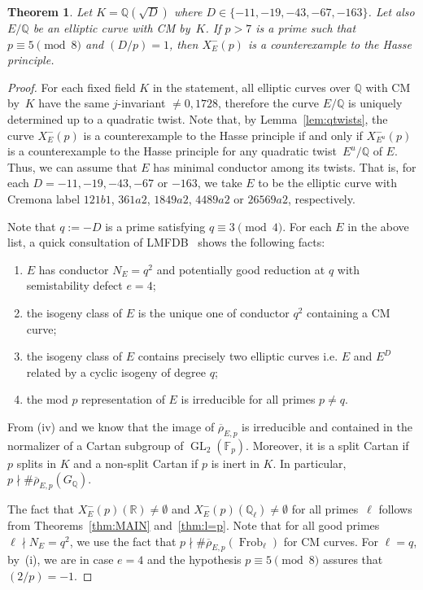 \documentclass[12pt]{amsart}
\numberwithin{equation}{section}
\newtheorem{theorem}[equation]{Theorem}
\theoremstyle{definition}
\newcommand{\F}{\mathbb{F}}
\newcommand{\Q}{\mathbb{Q}}
\newcommand{\R}{\mathbb{R}}
\newcommand{\rhobar}{{\overline{\rho}}}
\newcommand{\Xp}{X_E^{-}(p)}
\DeclareMathOperator{\GL}{GL}
\DeclareMathOperator{\Frob}{Frob}
\begin{document}
\begin{theorem} \label{thm:HasseSplit}
Let $K=\Q(\sqrt{D})$ where $D \in \{-11,-19,-43,-67,-163 \}$. Let also $E/\Q$ be an elliptic curve with CM by~$K$. If $p > 7$ is a prime such that $p \equiv 5 \pmod{8}$ and $(D / p) = 1$, then $\Xp$ is a counterexample to the Hasse principle.
\end{theorem}
\begin{proof}
For each fixed field $K$ in the statement, all elliptic curves over $\Q$ with CM by~$K$ have the same
$j$-invariant $\neq 0, 1728$, therefore the curve $E/\Q$ is uniquely determined up to a quadratic twist. Note that, by Lemma~\ref{lem:qtwists}, the curve $\Xp$ is a counterexample to the Hasse principle if and only if $X_{E^u}^-(p)$ is a counterexample to the Hasse principle for any quadratic twist~$E^u /\Q$ of $E$. Thus,
we can assume that $E$ has minimal conductor among its twists. That is, for each $D = -11,-19,-43,-67$ or $-163$, we take $E$ to be the elliptic curve with Cremona label
$121b1$, $361a2$, $1849a2$, $4489a2$ or $26569a2$, respectively.

Note that $q := -D$ is a prime satisfying $q \equiv 3 \pmod{4}$.
For each $E$ in the above list, a quick consultation of LMFDB~\cite{LMFDB} shows the following facts: 
\begin{enumerate}
    \item[(i)] $E$ has conductor $N_E=q^2$ and potentially good reduction at $q$ with semistability defect $e = 4$;\label{CM1}
        \item[(ii)] the isogeny class of $E$ is the unique one of conductor $q^2$ containing a CM curve; \label{CM3}
    \item[(iii)] the isogeny class of $E$ contains precisely two elliptic curves i.e. $E$ and $E^D$ related by a cyclic isogeny of degree $q$; \label{CM2}
    \item[(iv)] the mod $p$ representation of $E$ is irreducible for all primes $p \neq q$. \label{CM4}
\end{enumerate}

From (iv) and \cite[p. 422, Th\'eor\`eme 7]{Halberstadt} we know that the image of $\rhobar_{E,p}$ is irreducible and contained in the normalizer of a Cartan subgroup of $\GL_2(\F_p)$. Moreover, it is a split Cartan if $p$ splits in $K$ and a non-split Cartan if $p$ is inert in $K$.
In particular, $p \nmid \#\rhobar_{E,p}(G_\Q)$.

The fact that $X_{E}^-(p)(\R) \neq \emptyset$ and $\Xp(\Q_\ell) \neq \emptyset$ for all primes~$\ell$ follows from Theorems~\ref{thm:MAIN} and~\ref{thm:l=p}. Note that for all good primes~$\ell \nmid N_E = q^2$, we use the fact that $p \nmid \#\rhobar_{E,p}(\Frob_\ell)$ for CM curves. For $\ell=q$, by~(i), we are in case $e=4$ and the hypothesis $p \equiv 5 \pmod{8}$ assures that $(2/p)=-1$.


\end{proof}
\end{document}
